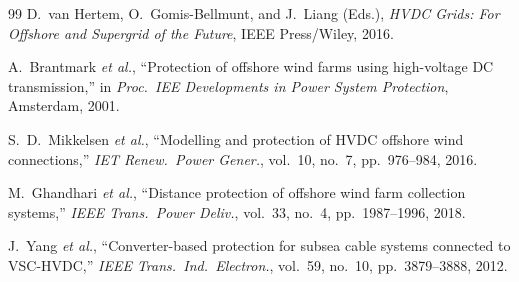 \documentclass[11pt, a4paper]{article}
\begin{document}
\begin{thebibliography}{99}
D.~van Hertem, O.~Gomis-Bellmunt, and J.~Liang (Eds.),
\emph{HVDC Grids: For Offshore and Supergrid of the Future},
IEEE Press/Wiley, 2016.

A.~Brantmark \emph{et al.},
``Protection of offshore wind farms using high-voltage DC transmission,''
in \emph{Proc.\ IEE Developments in Power System Protection}, Amsterdam, 2001.

S.~D.~Mikkelsen \emph{et al.},
``Modelling and protection of HVDC offshore wind connections,''
\emph{IET Renew.\ Power Gener.}, vol.~10, no.~7, pp.~976--984, 2016.

M.~Ghandhari \emph{et al.},
``Distance protection of offshore wind farm collection systems,''
\emph{IEEE Trans.\ Power Deliv.}, vol.~33, no.~4, pp.~1987--1996, 2018.

J.~Yang \emph{et al.},
``Converter-based protection for subsea cable systems connected to VSC-HVDC,''
\emph{IEEE Trans.\ Ind.\ Electron.}, vol.~59, no.~10, pp.~3879--3888, 2012.
\end{thebibliography}
\end{document}
